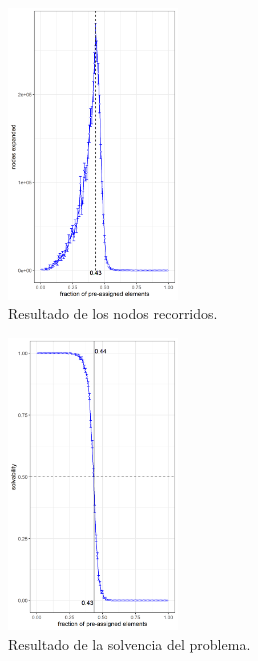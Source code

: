 \documentclass[11pt,letterpaper]{article}
\begin{document}
\newpage
\begin{multicols}{2}
	\begin{figure}[H]
		\centering
		\includegraphics[width=0.4\textwidth]{img/nodes.png}
		\caption{Resultado de los nodos recorridos.}
		\label{fig:nodos}
	\end{figure}
	
	\begin{figure}[H]
		\centering
		\includegraphics[width=0.4\textwidth]{img/solvability.png}
		\caption{Resultado de la solvencia del problema.}
		\label{fig:solvencia}
	\end{figure}
\end{multicols}
\end{document}
